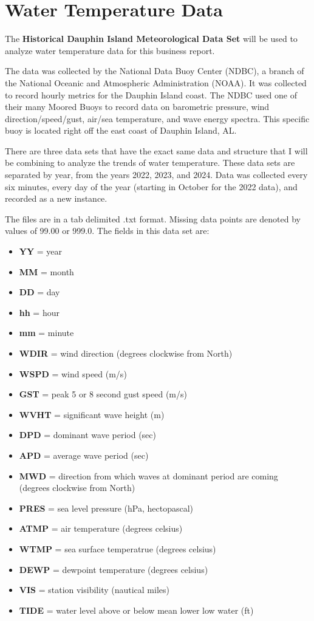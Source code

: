 \documentclass[
  letterpaper,
  DIV=11,
  numbers=noendperiod]{scrreprt}
\providecommand{\tightlist}{%
  \setlength{\itemsep}{0pt}\setlength{\parskip}{0pt}}\usepackage{longtable,booktabs,array}
\begin{document}
\hypertarget{water-temperature-data}{%
\section{Water Temperature Data}\label{water-temperature-data}}

The \textbf{Historical Dauphin Island Meteorological Data Set} will be
used to analyze water temperature data for this business report.

The data was collected by the National Data Buoy Center (NDBC), a branch
of the National Oceanic and Atmospheric Administration (NOAA). It was
collected to record hourly metrics for the Dauphin Island coast. The
NDBC used one of their many Moored Buoys to record data on barometric
pressure, wind direction/speed/gust, air/sea temperature, and wave
energy spectra. This specific buoy is located right off the east coast
of Dauphin Island, AL.

There are three data sets that have the exact same data and structure
that I will be combining to analyze the trends of water temperature.
These data sets are separated by year, from the years 2022, 2023, and
2024. Data was collected every six minutes, every day of the year
(starting in October for the 2022 data), and recorded as a new instance.

The files are in a tab delimited .txt format. Missing data points are
denoted by values of 99.00 or 999.0. The fields in this data set are:

\begin{itemize}
\tightlist
\item
  \textbf{YY} = year
\item
  \textbf{MM} = month
\item
  \textbf{DD} = day
\item
  \textbf{hh} = hour
\item
  \textbf{mm} = minute
\item
  \textbf{WDIR} = wind direction (degrees clockwise from North)
\item
  \textbf{WSPD} = wind speed (m/s)
\item
  \textbf{GST} = peak 5 or 8 second gust speed (m/s)
\item
  \textbf{WVHT} = significant wave height (m)
\item
  \textbf{DPD} = dominant wave period (sec)
\item
  \textbf{APD} = average wave period (sec)
\item
  \textbf{MWD} = direction from which waves at dominant period are
  coming (degrees clockwise from North)
\item
  \textbf{PRES} = sea level pressure (hPa, hectopascal)
\item
  \textbf{ATMP} = air temperature (degrees celsius)
\item
  \textbf{WTMP} = sea surface temperatrue (degrees celsius)
\item
  \textbf{DEWP} = dewpoint temperature (degrees celsius)
\item
  \textbf{VIS} = station visibility (nautical miles)
\item
  \textbf{TIDE} = water level above or below mean lower low water (ft)
\end{itemize}
\end{document}
